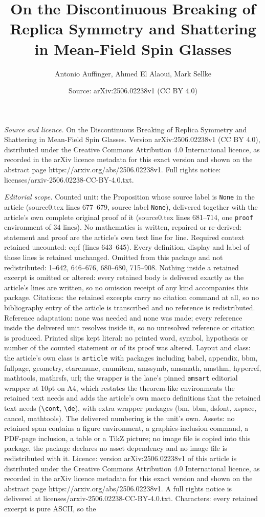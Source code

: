 \documentclass[10pt,a4paper]{amsart}
\title[On the Discontinuous Breaking of Replica Symmetry and Shatte]{On the Discontinuous Breaking of Replica Symmetry and Shattering in Mean-Field Spin Glasses}
\author{Antonio Auffinger, Ahmed El Alaoui, Mark Sellke}
\date{Source: arXiv:2506.02238v1 (CC BY 4.0)}
\begin{document}
\maketitle

\noindent\emph{Source and licence.} On the Discontinuous Breaking of Replica Symmetry and Shattering in Mean-Field Spin Glasses. Version arXiv:2506.02238v1 (CC BY 4.0), distributed under the Creative Commons Attribution 4.0 International licence, as recorded in the arXiv licence metadata for this exact version and shown on the abstract page https://arxiv.org/abs/2506.02238v1. Full rights notice: licenses/arxiv-2506.02238-CC-BY-4.0.txt.\par\smallskip

\noindent\textit{Editorial scope.} Counted unit: the Proposition whose source label is \texttt{None} in the article (source0.tex lines 677--679, source label \texttt{None}), delivered together with the article's own complete original proof of it (source0.tex lines 681--714, one \texttt{proof} environment of 34 lines). No mathematics is written, repaired or re-derived: statement and proof are the article's own text line for line. Required context retained uncounted: eq:f (lines 643--645). Every definition, display and label of those lines is retained unchanged. Omitted from this package and not redistributed: 1--642, 646--676, 680--680, 715--908. Nothing inside a retained excerpt is omitted or altered: every retained body is delivered exactly as the article's lines are written, so no omission receipt of any kind accompanies this package. Citations: the retained excerpts carry no citation command at all, so no bibliography entry of the article is transcribed and no reference is redistributed. Reference adaptation: none was needed and none was made; every reference inside the delivered unit resolves inside it, so no unresolved reference or citation is produced. Printed slips kept literal: no printed word, symbol, hypothesis or number of the counted statement or of its proof was altered. Layout and class: the article's own class is \texttt{article} with packages including babel, appendix, bbm, fullpage, geometry, etaremune, enumitem, amssymb, amsmath, amsthm, hyperref, mathtools, mathrsfs, url; the wrapper is the lane's pinned \texttt{amsart} editorial wrapper at 10pt on A4, which restates the theorem-like environments the retained text needs and adds the article's own macro definitions that the retained text needs (\texttt{\textbackslash cont}, \texttt{\textbackslash de}), with extra wrapper packages (bm, bbm, dsfont, xspace, cancel, mathtools). The delivered numbering is the unit's own. Assets: no retained span contains a figure environment, a graphics-inclusion command, a PDF-page inclusion, a table or a TikZ picture; no image file is copied into this package, the package declares no asset dependency and no image file is redistributed with it. Licence: version arXiv:2506.02238v1 of this article is distributed under the Creative Commons Attribution 4.0 International licence, as recorded in the arXiv licence metadata for this exact version and shown on the abstract page https://arxiv.org/abs/2506.02238v1. A full rights notice is delivered at licenses/arxiv-2506.02238-CC-BY-4.0.txt. Characters: every retained excerpt is pure ASCII, so the 
\end{document}

